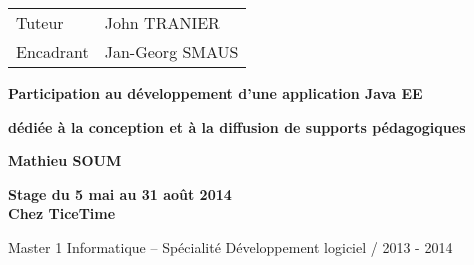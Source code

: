 \begin{titlepage}
\parindent=0pt
\begin{tabular}[h]{l@{ : }l}
  Tuteur & John TRANIER \\
  Encadrant & Jan-Georg SMAUS
\end{tabular}
\vspace{3.5cm}
\begin{center}
\end{center}
\vspace{2cm}
\hrulefill
\begin{center}\bfseries\Huge
  Participation au développement d’une application Java EE
\end{center}
\hrulefill
\begin{center}\bfseries\Large
  dédiée à la conception et à la diffusion de supports pédagogiques
\end{center}
\vspace*{0.5cm}
\begin{center}\bfseries\Large
  Mathieu SOUM
\end{center}
\vspace*{0.2cm}
\begin{center}\bfseries
  Stage du 5 mai au 31 août 2014\\Chez TiceTime
\end{center}
\vfill
\vspace{2cm}
\begin{flushright}
  Master 1 Informatique -- Spécialité Développement logiciel / 2013 - 2014
\end{flushright}
  
\end{titlepage}
